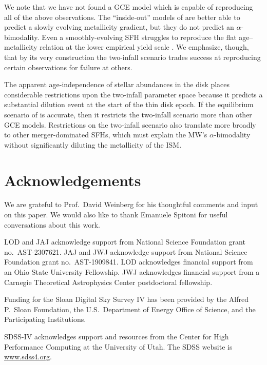 \documentclass[twocolumn,twocolappendix,linenumbers]{aastex631}
\begin{document}
We note that we have not found a GCE model which is capable of reproducing all of the above observations. The ``inside-out'' models of \citet{johnson_stellar_2021} are better able to predict a slowly evolving metallicity gradient, but they do not predict an $\alpha$-bimodality. Even a smoothly-evolving SFH struggles to reproduce the flat age--metallicity relation at the lower empirical yield scale \citep{johnson_milky_2024}. We emphasize, though, that by its very construction the two-infall scenario trades success at reproducing certain observations for failure at others.

The apparent age-independence of stellar abundances in the disk places considerable restrictions upon the two-infall parameter space because it predicts a substantial dilution event at the start of the thin disk epoch. If the equilibrium scenario of \citet{johnson_milky_2024} is accurate, then it restricts the two-infall scenario more than other GCE models. Restrictions on the two-infall scenario also translate more broadly to other merger-dominated SFHs, which must explain the MW's $\alpha$-bimodality without significantly diluting the metallicity of the ISM.

\section*{Acknowledgements}

We are grateful to Prof.\ David Weinberg for his thoughtful comments and input on this paper. We would also like to thank Emanuele Spitoni for useful conversations about this work.

LOD and JAJ acknowledge support from National Science Foundation grant no.\ AST-2307621. JAJ and JWJ acknowledge support from National Science Foundation grant no.\ AST-1909841.
LOD acknowledges financial support from an Ohio State University Fellowship.
JWJ acknowledges financial support from a Carnegie Theoretical Astrophysics Center postdoctoral fellowship.

Funding for the Sloan Digital Sky 
Survey IV has been provided by the 
Alfred P.\ Sloan Foundation, the U.S.\ 
Department of Energy Office of 
Science, and the Participating 
Institutions. 

SDSS-IV acknowledges support and 
resources from the Center for High 
Performance Computing  at the 
University of Utah. The SDSS 
website is \url{www.sdss4.org}.
\end{document}
